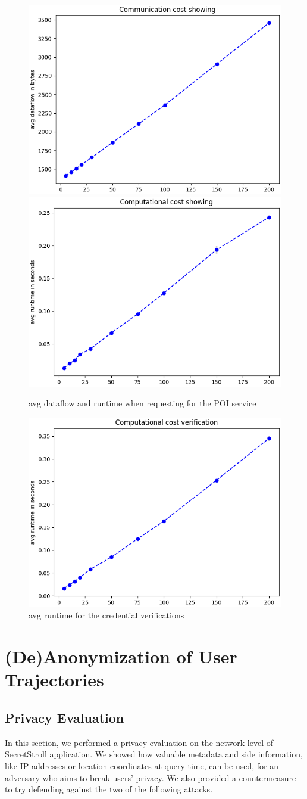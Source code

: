 \documentclass[10pt,conference,compsocconf]{IEEEtran}
\begin{document}
\begin{figure}[h!]
    \includegraphics[width=0.49\linewidth]{../performance_analysis/dataflow_showing.png}
    \includegraphics[width=0.49\linewidth]{../performance_analysis/runtime_showing.png}
    \caption{avg dataflow and runtime when requesting for the POI service}
    \label{fig:showing}
\end{figure}

\begin{figure}[h!]
    \includegraphics[width=0.49\linewidth]{../performance_analysis/runtime_verification}
    \caption{avg runtime for the credential verifications}
    \label{fig:verify}
\end{figure}


\section{(De)Anonymization of User Trajectories}

\subsection{Privacy Evaluation}
In this section, we performed a privacy evaluation on the network level of
SecretStroll application. We showed how valuable metadata and side information,
like IP addresses or location coordinates at query time, can be used, for an
adversary who aims to break users' privacy. We also provided a countermeasure to
try defending against the two of the following attacks.
\end{document}
